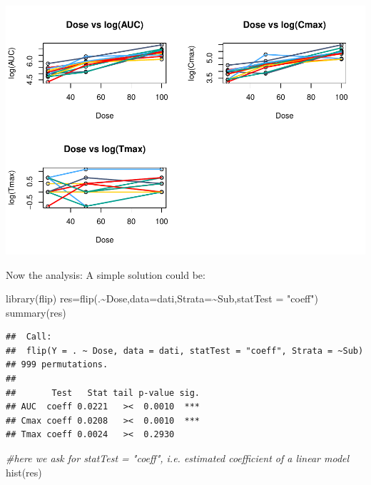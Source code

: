 \documentclass[
]{article}
\newenvironment{Shaded}{\begin{snugshade}}{\end{snugshade}}
\newcommand{\AttributeTok}[1]{\textcolor[rgb]{0.77,0.63,0.00}{#1}}
\newcommand{\CommentTok}[1]{\textcolor[rgb]{0.56,0.35,0.01}{\textit{#1}}}
\newcommand{\FunctionTok}[1]{\textcolor[rgb]{0.00,0.00,0.00}{#1}}
\newcommand{\NormalTok}[1]{#1}
\newcommand{\OtherTok}[1]{\textcolor[rgb]{0.56,0.35,0.01}{#1}}
\newcommand{\SpecialCharTok}[1]{\textcolor[rgb]{0.00,0.00,0.00}{#1}}
\newcommand{\StringTok}[1]{\textcolor[rgb]{0.31,0.60,0.02}{#1}}
\begin{document}
\begin{center}\includegraphics{perm_files/figure-latex/unnamed-chunk-45-1} \end{center}

Now the analysis: A simple solution could be:

\begin{Shaded}
\begin{Highlighting}[]
\FunctionTok{library}\NormalTok{(flip)}
\NormalTok{res}\OtherTok{=}\FunctionTok{flip}\NormalTok{(.}\SpecialCharTok{\textasciitilde{}}\NormalTok{Dose,}\AttributeTok{data=}\NormalTok{dati,}\AttributeTok{Strata=}\SpecialCharTok{\textasciitilde{}}\NormalTok{Sub,}\AttributeTok{statTest =} \StringTok{"coeff"}\NormalTok{)}
\FunctionTok{summary}\NormalTok{(res)}
\end{Highlighting}
\end{Shaded}

\begin{verbatim}
##  Call:
##  flip(Y = . ~ Dose, data = dati, statTest = "coeff", Strata = ~Sub) 
## 999 permutations.
## 
##       Test   Stat tail p-value sig.
## AUC  coeff 0.0221   ><  0.0010  ***
## Cmax coeff 0.0208   ><  0.0010  ***
## Tmax coeff 0.0024   ><  0.2930
\end{verbatim}

\begin{Shaded}
\begin{Highlighting}[]
\CommentTok{\#here we ask for statTest = "coeff", i.e. estimated coefficient of a linear model}
\FunctionTok{hist}\NormalTok{(res)}
\end{Highlighting}
\end{Shaded}
\end{document}
